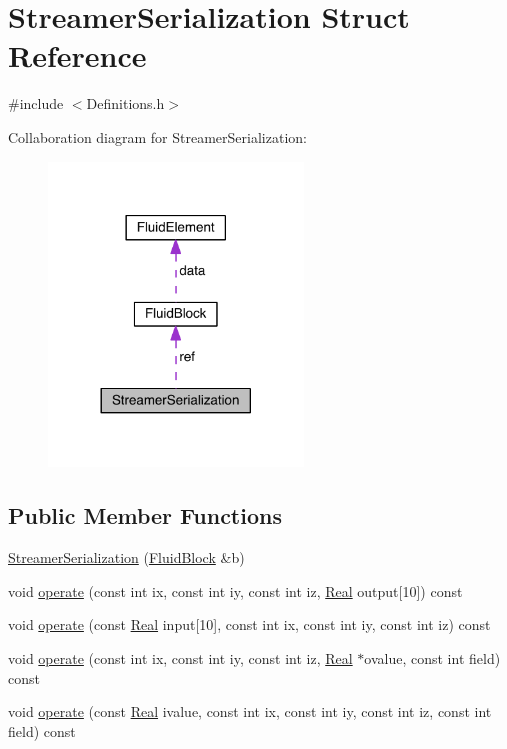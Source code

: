 \hypertarget{struct_streamer_serialization}{}\section{Streamer\+Serialization Struct Reference}
\label{struct_streamer_serialization}


{\ttfamily \#include $<$Definitions.\+h$>$}



Collaboration diagram for Streamer\+Serialization\+:\nopagebreak
\begin{figure}[H]
\begin{center}
\leavevmode
\includegraphics[width=192pt]{dc/d53/struct_streamer_serialization__coll__graph}
\end{center}
\end{figure}
\subsection*{Public Member Functions}
\begin{DoxyCompactItemize}
\item 
\hyperlink{struct_streamer_serialization_a4d6235cb19d24565811c6ced572699ba}{Streamer\+Serialization} (\hyperlink{struct_fluid_block}{Fluid\+Block} \&b)
\item 
void \hyperlink{struct_streamer_serialization_a2fcaf7abf186787c811601bb9e87235e}{operate} (const int ix, const int iy, const int iz, \hyperlink{_h_d_f5_dumper_8h_a445a5f0e2a34c9d97d69a3c2d1957907}{Real} output\mbox{[}10\mbox{]}) const 
\item 
void \hyperlink{struct_streamer_serialization_af17297287d267b95707a4d3bdc68feb5}{operate} (const \hyperlink{_h_d_f5_dumper_8h_a445a5f0e2a34c9d97d69a3c2d1957907}{Real} input\mbox{[}10\mbox{]}, const int ix, const int iy, const int iz) const 
\item 
void \hyperlink{struct_streamer_serialization_a8463f4eab1d7690189561a7cc2c27caf}{operate} (const int ix, const int iy, const int iz, \hyperlink{_h_d_f5_dumper_8h_a445a5f0e2a34c9d97d69a3c2d1957907}{Real} $\ast$ovalue, const int field) const 
\item 
void \hyperlink{struct_streamer_serialization_af850b6c92b1b7b30a44e053750016110}{operate} (const \hyperlink{_h_d_f5_dumper_8h_a445a5f0e2a34c9d97d69a3c2d1957907}{Real} ivalue, const int ix, const int iy, const int iz, const int field) const 
\end{DoxyCompactItemize}
